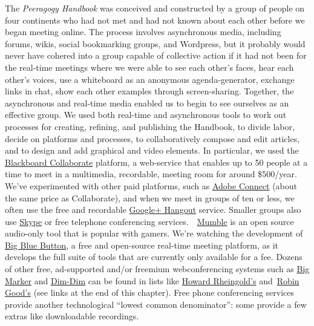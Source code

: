 The \emph{Peeragogy Handbook} was conceived and constructed by a group
of people on four continents who had not met and had not known about
each other before we began meeting online. The process involves
asynchronous media, including forums, wikis, social bookmarking groups,
and Wordpress, but it probably would never have cohered into a group
capable of collective action if it had not been for the real-time
meetings where we were able to see each other's faces, hear each other's
voices, use a whiteboard as an anonymous agenda-generator, exchange
links in chat, show each other examples through screen-sharing.
Together, the asynchronous and real-time media enabled us to begin to
see ourselves as an effective group. We used both real-time and
asynchronous tools to work out processes for creating, refining, and
publishing the Handbook, to divide labor, decide on platforms and
processes, to collaboratively compose and edit articles, and to design
and add graphical and video elements. In particular, we used the
\href{http://www.blackboard.com/platforms/collaborate/overview.aspx}{Blackboard
Collaborate} platform, a web-service that enables up to 50 people at a
time to meet in a multimedia, recordable, meeting room for around
\$500/year. We've experimented with other paid platforms, such as
\href{http://success.adobe.com/en/na/sem/products/connect/1109_6011_connect_webinars.html}{Adobe
Connect} (about the same price as Collaborate), and when we meet in
groups of ten or less, we often use the free and recordable
\href{http://www.google.com/+/learnmore/hangouts/}{Google+ Hangout}
service. Smaller groups also use \href{http://www.skype.com}{Skype} or
free telephone conferencing
services.~~\href{http://mumble.sourceforge.net/}{Mumble} is an open
source audio-only tool that is popular with gamers. We're watching the
development of \href{http://www.bigbluebutton.org/}{Big Blue Button}, a
free and open-source real-time meeting platform, as it develops the full
suite of tools that are currently only available for a fee. Dozens of
other free, ad-supported and/or freemium webconferencing systems such as
\href{http://www.bigmarker.com/about}{Big Marker} and
\href{http://www.dimdim.com}{Dim-Dim} can be found in lists like
\href{http://delicious.com/hrheingold/webconferencing}{Howard
Rheingold's}
and~\href{http://www.mindmeister.com/12213323/best-online-collaboration-tools-2012-robin-good-s-collaborative-map}{Robin
Good's} (see links at the end of this chapter). Free phone conferencing
services provide another technological ``lowest common denominator'':
some provide a few extras like downloadable recordings.

